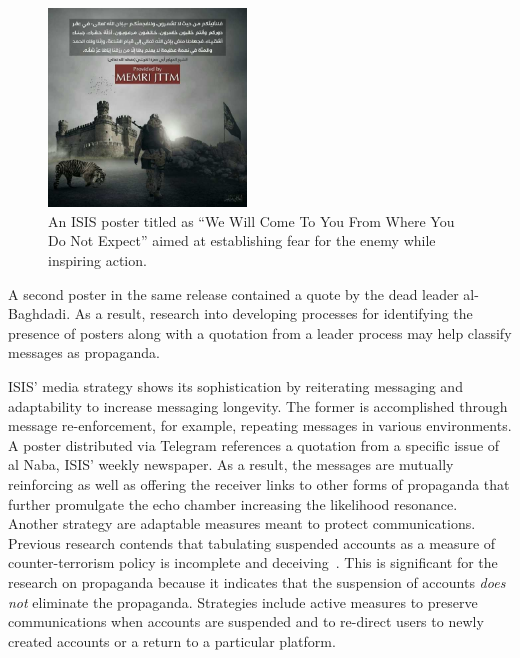 \documentclass[letterpaper]{article} %
\begin{document}
\begin{figure}[ht]
\includegraphics[width=0.47\textwidth]{img/poster2.jpeg}
\caption{An ISIS poster titled as ``We Will Come To You From Where You Do Not Expect'' aimed at establishing fear for the enemy while inspiring action.}
\label{fig:memri-poster}
\end{figure}

A second poster in the same release contained a quote by the dead leader al-Baghdadi. As a result, research into developing processes for identifying the presence of posters along with a quotation from a leader process may help classify messages as propaganda.

ISIS' media strategy shows its sophistication by reiterating messaging and adaptability to increase messaging longevity. The former is accomplished through message re-enforcement, for example, repeating messages in various environments. A poster distributed via Telegram references a quotation from a specific issue of al Naba, ISIS' weekly newspaper. As a result, the messages are mutually reinforcing as well as offering the receiver links to other forms of propaganda that further promulgate the echo chamber increasing the likelihood resonance. Another strategy are adaptable measures meant to protect communications. Previous research contends that tabulating suspended accounts as a  measure of counter-terrorism policy is incomplete and deceiving~\cite{weirman2020hyperlinked}.
This is significant for the research on propaganda because it indicates that the suspension of accounts\textit{ does not} eliminate the propaganda. Strategies include active measures to preserve communications when accounts are suspended and to re-direct users to newly created accounts or a return to a particular platform.
\end{document}
